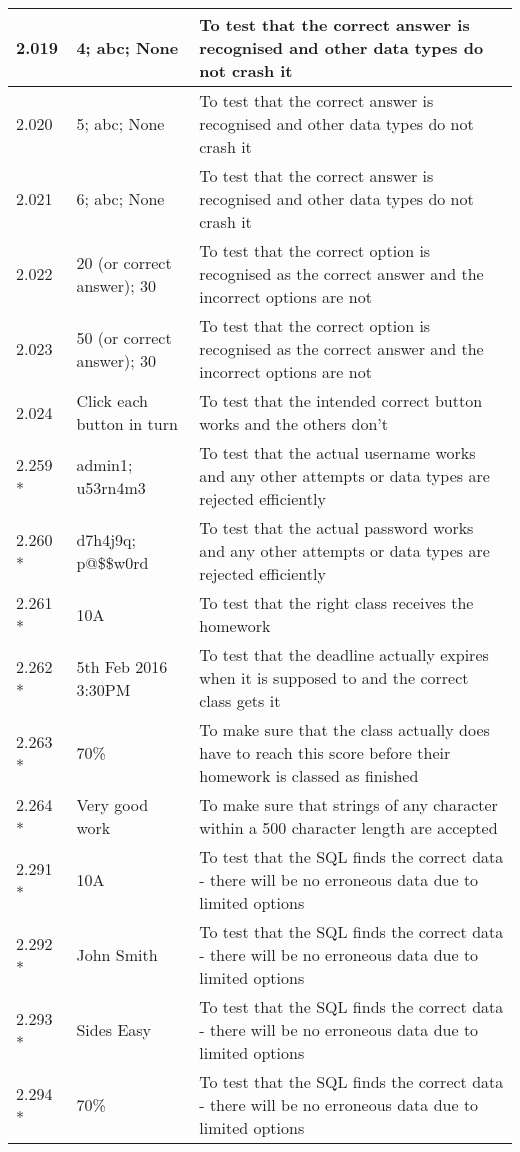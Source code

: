 \begin{landscape}
\begin{center}
\begin{longtable}{|p{4cm}|p{4cm}|p{5cm}|}
2.019 & 4; abc; None & To test that the correct answer is recognised and other data types do not crash it \\ \hline
2.020 & 5; abc; None & To test that the correct answer is recognised and other data types do not crash it \\ \hline
2.021 & 6; abc; None & To test that the correct answer is recognised and other data types do not crash it \\ \hline
2.022 & 20 (or correct answer); 30 & To test that the correct option is recognised as the correct answer and the incorrect options are not \\ \hline
2.023 & 50 (or correct answer); 30 & To test that the correct option is recognised as the correct answer and the incorrect options are not \\ \hline
2.024 & Click each button in turn & To test that the intended correct button works and the others don't \\ \hline
2.259 * & admin1; u53rn4m3 & To test that the actual username works and any other attempts or data types are rejected efficiently \\ \hline
2.260 * & d7h4j9q; p@\$\$w0rd & To test that the actual password works and any other attempts or data types are rejected efficiently \\ \hline
2.261 * & 10A & To test that the right class receives the homework \\ \hline
2.262 * & 5th Feb 2016 3:30PM & To test that the deadline actually expires when it is supposed to and the correct class gets it \\ \hline
2.263 * & 70\% & To make sure that the class actually does have to reach this score before their homework is classed as finished \\ \hline
2.264 * & Very good work & To make sure that strings of any character within a 500 character length are accepted \\ \hline
2.291 * & 10A & To test that the SQL finds the correct data - there will be no erroneous data due to limited options\\ \hline
2.292 * & John Smith & To test that the SQL finds the correct data - there will be no erroneous data due to limited options \\ \hline
2.293 * & Sides Easy & To test that the SQL finds the correct data - there will be no erroneous data due to limited options \\ \hline
2.294 * & 70\% & To test that the SQL finds the correct data - there will be no erroneous data due to limited options \\ \hline

\end{longtable}
\end{center}
\end{landscape}
